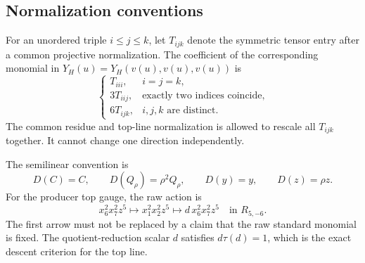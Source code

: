 \subsection{Normalization conventions}

For an unordered triple \(i\le j\le k\), let \(T_{ijk}\) denote the
symmetric tensor entry after a common projective normalization.  The
coefficient of the corresponding monomial in
\(Y_H(u)=Y_H(v(u),v(u),v(u))\) is
\[
 \begin{cases}
 T_{iii},&i=j=k,\\
 3T_{iij},&\text{exactly two indices coincide},\\
 6T_{ijk},&i,j,k\text{ are distinct}.
 \end{cases}                                       \tag{B.3}
\]
The common residue and top-line normalization is allowed to rescale all
\(T_{ijk}\) together.  It cannot change one direction independently.

The semilinear convention is
\[
 D(C)=C,\qquad D(Q_\rho)=\rho^2Q_\rho,\qquad
 D(y)=y,\qquad D(z)=\rho z.                        \tag{B.4}
\]
For the producer top gauge, the raw action is
\[
 x_6^2x_7^2z^5\longmapsto x_1^2x_2^2z^5
\longmapsto d\,x_6^2x_7^2z^5
 \quad\text{in }R_{5,-6}.                          \tag{B.5}
\]
The first arrow must not be replaced by a claim that the raw standard
monomial is fixed.  The quotient-reduction scalar \(d\) satisfies
\(d\tau(d)=1\), which is the exact descent criterion for the top line.
